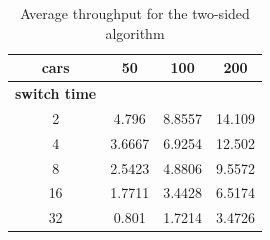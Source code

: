 \documentclass[a4paper,11pt]{article}
\begin{document}
\begin{table}[htb]
\centering
\begin{tabular}{cccc}
\hline
\textbf{cars} & 50 & 100 & 200\\
\hline
\textbf{switch time} & & & \\
2 & 4.796 & 8.8557 & 14.109 \\
4 & 3.6667 & 6.9254 & 12.502 \\
8 & 2.5423 & 4.8806 & 9.5572 \\
16 & 1.7711 & 3.4428 & 6.5174 \\
32 & 0.801 & 1.7214 & 3.4726 \\
\hline
\end{tabular}
\caption{Average throughput for the two-sided algorithm}
\end{table}
\end{document}
